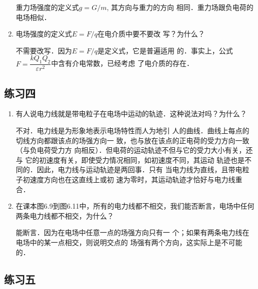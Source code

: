\begin{enumerate}
\begin{solution}
    重力场强度的定义式$g=G/m$, 其方向与重力的方向
    相同．重力场跟负电荷的电场相似．
\end{solution}

\item 电场强度的定义式$E=F/q$在电介质中要不要改
写？为什么？

\begin{solution}
    不需要改写．因为$E=F/q$是定义式，它是普遍适用
    的．事实上，公式$F=\dfrac{kQ_1Q_2}{\varepsilon r^2}$中含有介电常数，已经考虑
    了电介质的存在．
\end{solution}

\end{enumerate}


\subsection{练习四}

\begin{enumerate}
	\item 有人说电力线就是带电粒子在电场中运动的轨迹．这种说法对吗？为什么？

    \begin{solution}
不对．电力线是为形象地表示电场特性而人为地引
人的曲线．曲线上每点的切线方向都跟该点的场强方向一
致，也与放在该点的正电荷的受力方向一致（与负电荷受力方
向相反）．但电荷的运动轨迹不但与它的受力大小有关，还与
它的初速度有关，即使受力情况相同，如初速度不同，其运动
轨迹也是不同的．因此，电力线与运动轨迹是两回事．只有
当电力线为直线，且带电粒子初速度方向也在这直线上或初
速为零时，其运动轨迹才恰好与电力线重合．
    \end{solution}
    
	\item 在课本图6.9到图6.11中，所有的电力线都不相交，我们能否断言，电场中任何两条电力线都不相交，为什么？

    \begin{solution}
        能断言．因为在电场中任意一点的场强方向只有一
        个；如果有两条电力线在电场中的某一点相交，则说明交点的
        场强有两个方向，这实际上是不可能的．
    \end{solution}
    
\end{enumerate}


\subsection{练习五}

